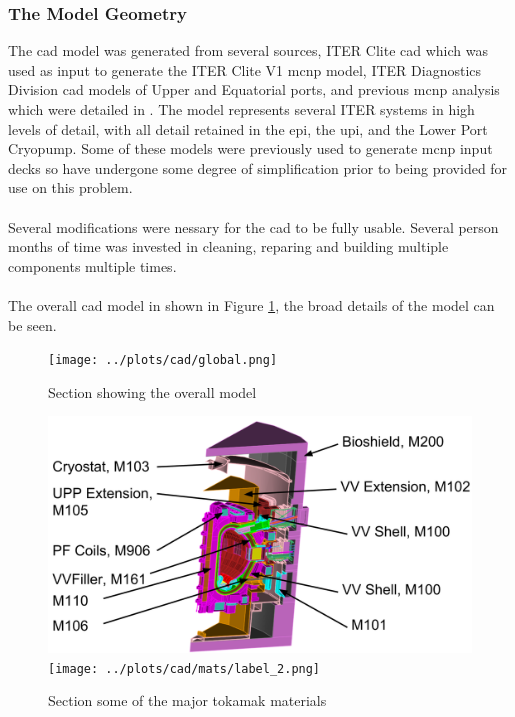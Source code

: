 \documentclass[12pt]{article}
\begin{document}
\subsubsection{The Model Geometry}
The \gls{cad} model was generated from several sources, ITER Clite \gls{cad}
which was used as input to generate the ITER Clite V1 \gls{mcnp} model, ITER
Diagnostics Division \gls{cad} models of Upper and Equatorial ports, and
previous \gls{mcnp} analysis which were detailed in \cite{cad_origination}. The
model represents several ITER systems in high levels of detail, with all detail
retained in the \gls{epi}, the  \gls{upi}, and the Lower Port Cryopump. Some of
these models were previously used to generate \gls{mcnp} input decks so have
undergone some degree of simplification prior to being provided for use on this 
problem.
\\
\\
Several modifications were nessary for the \gls{cad} to be fully usable. Several
person months of time was invested in cleaning, reparing and building multiple
components multiple times. 
\\
\\
The overall \gls{cad} model in shown in Figure \ref{fig:cad_iter_global}, the
broad details of the model can be seen. 
\begin{figure}[ht!]
  \centering
  \texttt{[image: ../plots/cad/global.png]}
  \caption{Section showing the overall model}
  \label{fig:cad_iter_global}
\end{figure}

\begin{figure}[p]
  \centering
  \includegraphics[scale=0.32]{../plots/cad/mats/label_1.png}
  \texttt{[image: ../plots/cad/mats/label\_2.png]}
  \caption{Section some of the major tokamak materials}
  \label{fig:material_assign_1}
\end{figure}
\end{document}
